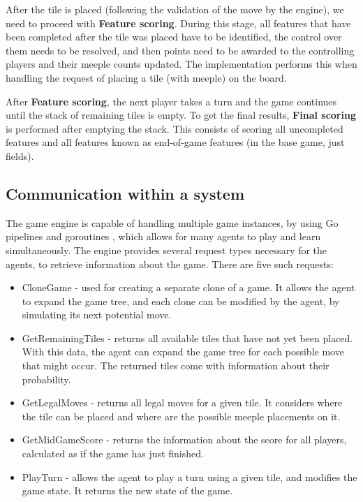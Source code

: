 After the tile is placed (following the validation of the move by the engine),
we need to proceed with \textbf{Feature scoring}. During this stage, all features that have been
completed after the tile was placed have to be identified, the control over them needs to be resolved,
and then points need to be awarded to the controlling players and their meeple counts updated.
The implementation performs this when handling the request of placing a tile (with meeple) on the board.

After \textbf{Feature scoring}, the next player takes a turn and the game continues
until the stack of remaining tiles is empty. To get the final results,
\textbf{Final scoring} is performed after emptying the stack. This consists of scoring
all uncompleted features and all features known as end-of-game features
(in the base game, just fields).

\subsection{Communication within a system} \label{communication}

The game engine is capable of handling multiple game instances, by using Go pipelines and goroutines \cite{GolangPipeline}, which allows for many agents to play and learn simultaneously. The engine provides several request types necessary for the agents, to retrieve information about the game. There are five such requests:
\begin{itemize}
    \item CloneGame - used for creating a separate clone of a game. It allows the agent to expand the game tree, and each clone can be modified by the agent, by simulating its next potential move.
    \item GetRemainingTiles - returns all available tiles that have not yet been placed. With this data, the agent can expand the game tree for each possible move that might occur. The returned tiles come with information about their probability.
    \item GetLegalMoves - returns all legal moves for a given tile. It considers where the tile can be placed and where are the possible meeple placements on it.
    \item GetMidGameScore - returns the information about the score for all players, calculated as if the game has just finished.
    \item PlayTurn - allows the agent to play a turn using a given tile, and modifies the game state. It returns the new state of the game.
\end{itemize}

